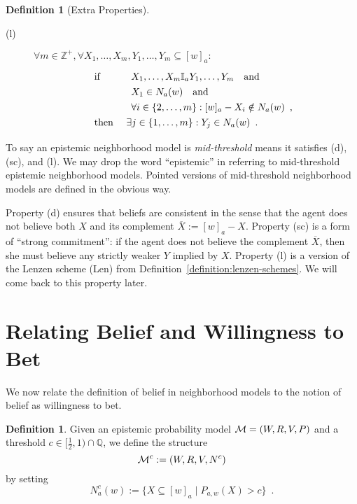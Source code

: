 \documentclass[12pt]{article}
\theoremstyle{definition}
\newtheorem{definition}[theorem]{Definition}
\newcommand{\Rat}{\mathbb{Q}}  %
\newcommand{\Int}{\mathbb{Z}}  %
\newcommand{\M}{{\cal M}}      %
\begin{document}
\begin{definition}[Extra Properties]
\begin{description}
  \item[(l)] $\forall m\in\Int^+,\forall
  X_1,\dots,X_m,Y_1,\dots,Y_m\subseteq[w]_a:$
  \[
  \renewcommand{\arraystretch}{1.3}
  \begin{array}{ll}
    \text{if }
    &
    \begin{array}[t]{l}
      X_1,\dots,X_m\mathbb{I}_aY_1,\dots,Y_m\quad\text{and}
      \\
      X_1\in N_a(w)\quad\text{and}
      \\
      \forall i\in\{2,\dots,m\}:
      [w]_a-X_i\notin N_a(w) \enspace\text{,}
    \end{array}
    \\
    \text{then }
    &
    \exists j\in\{1,\dots,m\}: Y_j\in N_a(w)\enspace\text{.}
  \end{array}
  \]
  \end{description}
  To say an epistemic neighborhood model is \emph{mid-threshold} means
  it satisfies (d), (sc), and (l).  We may drop the word ``epistemic''
  in referring to mid-threshold epistemic neighborhood models.
  Pointed versions of mid-threshold neighborhood models are defined in
  the obvious way.
\end{definition}

Property (d) ensures that beliefs are consistent in the sense that the
agent does not believe both $X$ and its complement
$\overline{X}:=[w]_a-X$.  Property (sc) is a form of ``strong
commitment'': if the agent does not believe the complement
$\overline{X}$, then she must believe any strictly weaker $Y$ implied
by $X$.  Property (l) is a version of the Lenzen scheme (Len) from
Definition~\ref{definition:lenzen-schemes}.  We will come back to this
property later.

\section{Relating Belief and Willingness to Bet}
\label{Section:BeliefBet}

We now relate the definition of belief in neighborhood models to the
notion of belief as willingness to bet.

\begin{definition}
  Given an epistemic probability model $\M = (W,R,V,P)$ and
  a threshold $c\in[\frac 12,1)\cap\Rat$, we define the structure
  \[
  \M^c := (W,R,V,N^c)
  \]
  by setting
  \[
  N^c_a(w) := \{X\subseteq[w]_a\mid P_{a,w}(X)>c\}\enspace.
  \]
\end{definition}
\end{document}
